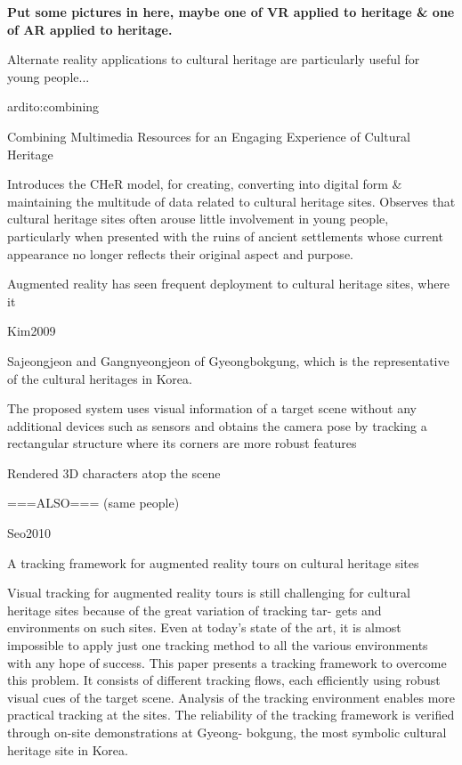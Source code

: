 \textbf{Put some pictures in here, maybe one of VR applied to heritage \& one of AR applied to heritage.}


Alternate reality applications to cultural heritage are particularly useful for young people...

ardito:combining

Combining Multimedia Resources
for an Engaging Experience of Cultural Heritage

Introduces the CHeR model, for creating, converting into digital form & maintaining the
multitude of data related to cultural heritage sites. Observes that cultural heritage sites
often arouse little involvement in young people, particularly when presented with the ruins
of ancient settlements whose current appearance no longer reflects their original aspect and purpose.


Augmented reality has seen frequent deployment to cultural heritage sites, where it


Kim2009

Sajeongjeon and Gangnyeongjeon of Gyeongbokgung, which is the representative of the cultural heritages in Korea.

The proposed system uses visual information of a target scene without any additional devices such as sensors and obtains the camera pose by tracking a rectangular structure where its corners are more robust features

Rendered 3D characters atop the scene

===ALSO=== (same people)

Seo2010

A tracking framework for augmented reality tours on cultural heritage sites

Visual tracking for augmented reality tours is still challenging for
cultural heritage sites because of the great variation of tracking tar-
gets and environments on such sites. Even at today’s state of the
art, it is almost impossible to apply just one tracking method to
all the various environments with any hope of success. This paper
presents a tracking framework to overcome this problem. It consists
of different tracking flows, each efficiently using robust visual cues
of the target scene. Analysis of the tracking environment enables
more practical tracking at the sites. The reliability of the tracking
framework is verified through on-site demonstrations at Gyeong-
bokgung, the most symbolic cultural heritage site in Korea.


